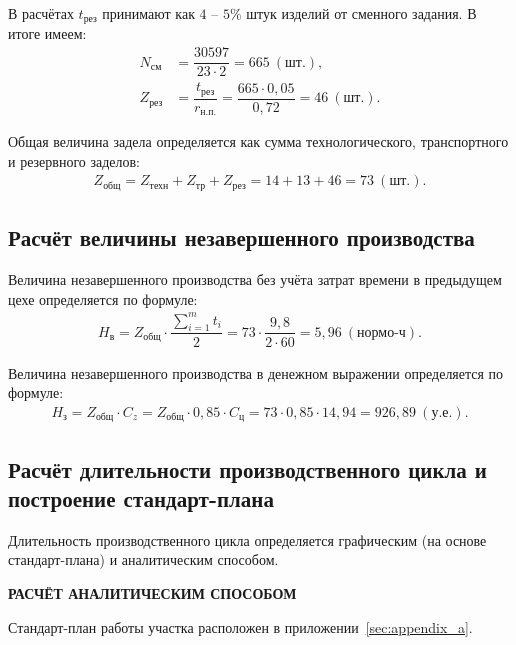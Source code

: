 В расчётах $ t_{\text{рез}} $ принимают как $4$ -- $5\%$ штук изделий от сменного
задания. В итоге имеем:
\begin{align*}
  N_{\text{см}} &= \dfrac{30597}{23 \cdot 2} = 665~(\text{шт.}), \\
  Z_{\text{рез}} &= \dfrac{t_{\text{рез}}}{r_{\text{н.п.}}} = \dfrac{665 \cdot 0{,}05}{0{,}72} = 46~(\text{шт.}).
\end{align*}

Общая величина задела определяется как сумма технологического, транспортного и
резервного заделов:
\begin{align*}
  Z_{\text{общ}} = Z_{\text{техн}} + Z_{\text{тр}} + Z_{\text{рез}} = 14 + 13 + 46 = 73~(\text{шт.}).
\end{align*}


\subsection{Расчёт величины незавершенного производства}

Величина незавершенного производства без учёта затрат времени в предыдущем цехе
определяется по формуле:
\begin{align*}
  H_{\text{в}} = Z_{\text{общ}} \cdot \dfrac{\sum\limits_{i=1}^m t_i}{2} = 73 \cdot \dfrac{9{,}8}{2 \cdot 60} = 5{,}96~(\text{нормо-ч}).
\end{align*}

Величина незавершенного производства в денежном выражении определяется по формуле:
\begin{align*}
  H_{\text{з}} = Z_{\text{общ}} \cdot C_z = Z_{\text{общ}} \cdot 0{,}85 \cdot C_{\text{ц}} =
  73 \cdot 0{,}85 \cdot 14{,}94 = 926{,}89~(\text{у.е.}).
\end{align*}

\subsection{Расчёт длительности производственного цикла и построение стандарт-плана}

Длительность производственного цикла определяется графическим (на основе
стандарт-плана) и аналитическим способом.

\textbf{РАСЧЁТ АНАЛИТИЧЕСКИМ СПОСОБОМ}

Стандарт-план работы участка расположен в приложении~\ref{sec:appendix_a}.
